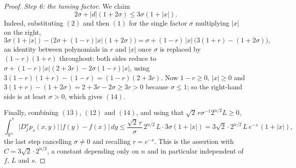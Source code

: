 \begin{proof}
\emph{Step 6: the taming factor.}
We claim
\begin{equation*}
  2\sigma + |d|(1+2\sigma) \leq 3\sigma(1+|x|) . \tag{14}
\end{equation*}
Indeed, substituting $(2)$ and then $(1)$ for the single factor $\sigma$ multiplying
$|x|$ on the right,
\[
  3\sigma(1+|x|) - \bigl(2\sigma + (1-r)|x|(1+2\sigma)\bigr)
    = \sigma + (1-r)\,|x|\,\bigl(3(1+r) - (1+2\sigma)\bigr) ,
\]
an identity between polynomials in $r$ and $|x|$ once $\sigma$ is replaced by
$(1-r)(1+r)$ throughout: both sides reduce to
$\sigma + (1-r)|x|(2+3r) - 2\sigma(1-r)|x|$, using
$3(1-r)(1+r) - (1-r) = (1-r)(2+3r)$.  Now $1-r \geq 0$, $|x| \geq 0$ and
$3(1+r) - (1+2\sigma) = 2+3r-2\sigma \geq 3r > 0$ because $\sigma \leq 1$; so the
right-hand side is at least $\sigma > 0$, which gives $(14)$.

Finally, combining $(13)$, $(12)$ and $(14)$, and using that
$\sqrt2\,r\sigma^{-1}2^{n/2}L \geq 0$,
\[
  \int^*_{\mathbb{R}^n}\bigl|D_j^xp_s(x,y)\bigr|\,|f(y)-f(x)|\,dy
    \leq \frac{\sqrt2\,r}{\sigma}\,2^{n/2}\,L\cdot3\sigma(1+|x|)
    = 3\sqrt2\cdot2^{n/2}\,L\,e^{-s}\,(1+|x|) ,
\]
the last step cancelling $\sigma \neq 0$ and recalling $r = e^{-s}$.  This is the
assertion with $C = 3\sqrt2\cdot2^{n/2}$, a constant depending only on $n$ and in
particular independent of $f$, $L$ and $s$.
\end{proof}
